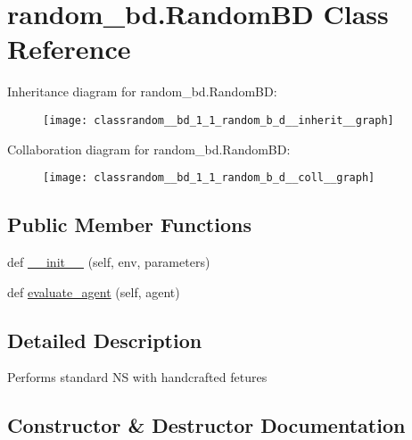 \hypertarget{classrandom__bd_1_1_random_b_d}{}\section{random\+\_\+bd.\+Random\+BD Class Reference}
\label{classrandom__bd_1_1_random_b_d}


Inheritance diagram for random\+\_\+bd.\+Random\+BD\+:
\nopagebreak
\begin{figure}[H]
\begin{center}
\leavevmode
\texttt{[image: classrandom\_\_bd\_1\_1\_random\_b\_d\_\_inherit\_\_graph]}
\end{center}
\end{figure}


Collaboration diagram for random\+\_\+bd.\+Random\+BD\+:
\nopagebreak
\begin{figure}[H]
\begin{center}
\leavevmode
\texttt{[image: classrandom\_\_bd\_1\_1\_random\_b\_d\_\_coll\_\_graph]}
\end{center}
\end{figure}
\subsection*{Public Member Functions}
\begin{DoxyCompactItemize}
\item 
def \hyperlink{classrandom__bd_1_1_random_b_d_a7b6822fb4b8cd9577e8217c03832031f}{\+\_\+\+\_\+init\+\_\+\+\_\+} (self, env, parameters)
\item 
def \hyperlink{classrandom__bd_1_1_random_b_d_a67cd7c2175c7ff9db2ee49a7de72f172}{evaluate\+\_\+agent} (self, agent)
\end{DoxyCompactItemize}


\subsection{Detailed Description}
\begin{DoxyVerb}Performs standard NS with handcrafted fetures
\end{DoxyVerb}
 

\subsection{Constructor \& Destructor Documentation}
